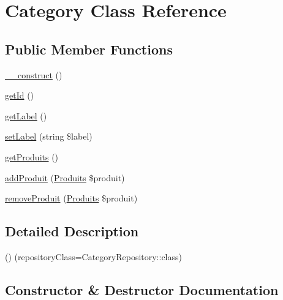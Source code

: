 \hypertarget{class_app_1_1_entity_1_1_category}{}\section{Category Class Reference}
\label{class_app_1_1_entity_1_1_category}
\subsection*{Public Member Functions}
\begin{DoxyCompactItemize}
\item 
\mbox{\hyperlink{class_app_1_1_entity_1_1_category_a095c5d389db211932136b53f25f39685}{\+\_\+\+\_\+construct}} ()
\item 
\mbox{\hyperlink{class_app_1_1_entity_1_1_category_a12251d0c022e9e21c137a105ff683f13}{get\+Id}} ()
\item 
\mbox{\hyperlink{class_app_1_1_entity_1_1_category_a14c4e7420d903d3e40342266333d2ecf}{get\+Label}} ()
\item 
\mbox{\hyperlink{class_app_1_1_entity_1_1_category_adc435edb6ffd860b94dc2561a6cdb2be}{set\+Label}} (string \$label)
\item 
\mbox{\hyperlink{class_app_1_1_entity_1_1_category_ac4ae2b107901ad7dd44af9821aba87c7}{get\+Produits}} ()
\item 
\mbox{\hyperlink{class_app_1_1_entity_1_1_category_a5875f1e30c617aab128df24fd45d22b1}{add\+Produit}} (\mbox{\hyperlink{class_app_1_1_entity_1_1_produits}{Produits}} \$produit)
\item 
\mbox{\hyperlink{class_app_1_1_entity_1_1_category_a737ead4d9c5fb03ce667d58783ce74c9}{remove\+Produit}} (\mbox{\hyperlink{class_app_1_1_entity_1_1_produits}{Produits}} \$produit)
\end{DoxyCompactItemize}


\subsection{Detailed Description}
() (repository\+Class=Category\+Repository\+::class) 

\subsection{Constructor \& Destructor Documentation}
\mbox{\label{class_app_1_1_entity_1_1_category_a095c5d389db211932136b53f25f39685}} 
